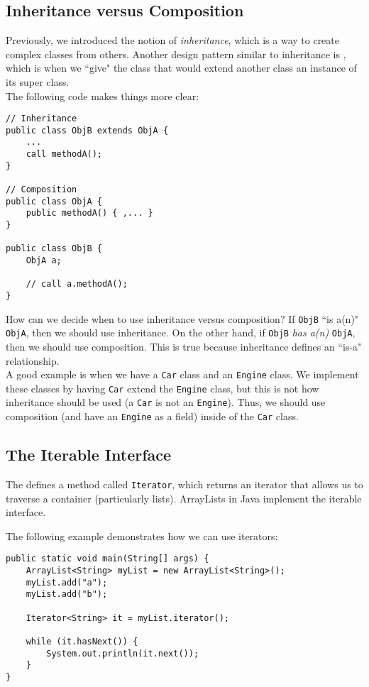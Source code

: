 \subsection{Inheritance versus Composition}

Previously, we introduced the notion of \textit{inheritance}, which is a way to create complex classes from others. Another design pattern similar to inheritance is , which is when we ``give" the class that would extend another class an instance of its super class. \\

The following code makes things more clear:

\begin{lstlisting}
// Inheritance
public class ObjB extends ObjA {
    ... 
    call methodA();
}

// Composition
public class ObjA {
    public methodA() { ,... }
}

public class ObjB { 
    ObjA a;
    
    // call a.methodA();
}
\end{lstlisting}

How can we decide when to use inheritance versus composition? If \verb!ObjB! ``is a(n)" \verb!ObjA!, then we should use inheritance. On the other hand, if \verb!ObjB! \textit{has a(n)} \verb!ObjA!, then we should use composition. This is true because inheritance defines an ``is-a" relationship. \\

A good example is when we have a \verb!Car! class and an \verb!Engine! class. We implement these classes by having \verb!Car! extend the \verb!Engine! class, but this is not how inheritance should be used (a \verb!Car! is not an \verb!Engine!). Thus, we should use composition (and have an \verb!Engine! as a field) inside of the \verb!Car! class.


 \subsection{The Iterable Interface}
The  defines a method called \verb!Iterator!, which returns an iterator that allows us to traverse a container (particularly lists). ArrayLists in Java implement the iterable interface. 

The following example demonstrates how we can use iterators:

\begin{lstlisting}
public static void main(String[] args) {
    ArrayList<String> myList = new ArrayList<String>();
    myList.add("a");
    myList.add("b");
    
    Iterator<String> it = myList.iterator();

    while (it.hasNext()) {
        System.out.println(it.next());
    }
}
\end{lstlisting}

